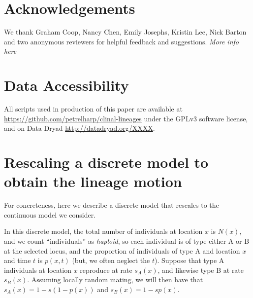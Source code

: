 \documentclass[11pt,letterpaper]{article}
\newcommand{\alisa}[1]{{\em \color{red} #1}}
\begin{document}

\section*{Acknowledgements}
We thank Graham Coop, Nancy Chen, Emily Josephs, Kristin Lee, Nick Barton and two anonymous reviewers for helpful feedback and suggestions. \alisa{More info here}




\section*{Data Accessibility}

All scripts used in production of this paper are available at 
\url{https://github.com/petrelharp/clinal-lineages}
under the GPLv3 software license,
and on Data Dryad \url{http://datadryad.org/XXXX}.

\appendix
\setcounter{table}{0}
\renewcommand{\thetable}{S\arabic{table}}
\setcounter{figure}{0}
\renewcommand{\thefigure}{S\arabic{figure}}


\section{Rescaling a discrete model to obtain the lineage motion}
\label{apx:lineage_derivation}

For concreteness, here we describe a discrete model that rescales to the continuous model we consider.

In this discrete model, the total number of individuals at location $x$ is $N(x)$,
and we count ``individuals'' as \emph{haploid},
so each individual is of type either A or B at the selected locus,
and the proportion of individuals of type A and location $x$ and time $t$ is $p(x,t)$
(but, we often neglect the $t$).
Suppose that type A individuals at location $x$ reproduce at rate $s_A(x)$, 
and likewise type B at rate $s_B(x)$.
Assuming locally random mating, we will then have that
$s_A(x) = 1 - s (1-p(x))$ and $s_B(x) = 1 - s p(x)$.
\end{document}
